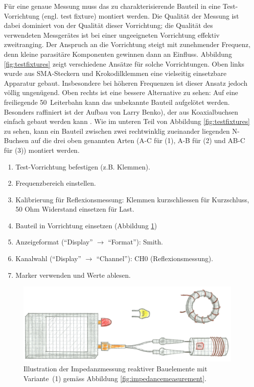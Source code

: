 \documentclass[twoside,a4paper,11pt,halfparskip,DIV=11,notitlepage]{scrartcl}
\begin{document}
Für eine genaue Messung muss das zu charakterisierende Bauteil in eine
Test-Vorrichtung (engl. test fixture) montiert werden. Die Qualität der Messung
ist dabei dominiert von der Qualität dieser Vorrichtung; die Qualität des
verwendeten Messgerätes ist bei einer ungeeigneten Vorrichtung effektiv
zweitranging. Der Anspruch an die Vorrichtung steigt mit zunehmender Frequenz,
denn kleine parasitäre Komponenten gewinnen dann an Einfluss. Abbildung
\ref{fig:testfixtures} zeigt verschiedene Ansätze für solche Vorrichtungen.
Oben links wurde aus SMA-Steckern und Krokodilklemmen eine vielseitig
einsetzbare Apparatur gebaut. Insbesondere bei höheren Frequenzen ist dieser
Ansatz jedoch völlig ungenügend. Oben rechts ist eine bessere Alternative zu
sehen: Auf eine freiliegende 50~\Ohm Leiterbahn kann das unbekannte
Bauteil aufgelötet werden. Besonders raffiniert ist der Aufbau von Larry
Benko), der aus Koaxialbuchsen einfach gebaut werden kann
\cite{benko2020impedance}.  Wie im unteren Teil von Abbildung
\ref{fig:testfixtures} zu sehen, kann ein Bauteil zwischen zwei rechtwinklig
zueinander liegenden N-Buchsen auf die drei oben genannten Arten (A-C für (1),
A-B für (2) und AB-C für (3)) montiert werden.


\begin{enumerate}
    \item Test-Vorrichtung befestigen (z.B. Klemmen).
    \item Frequenzbereich einstellen.
    \item Kalibrierung für Reflexionsmessung: Klemmen kurzschliessen für Kurzschluss, 50 Ohm Widerstand
        einsetzen für Last.
    \item Bauteil in Vorrichtung einsetzen (Abbildung \ref{fig:illustrationimpedance})
    \item Anzeigeformat (``Display'' $\longrightarrow$ ``Format''): Smith.
    \item Kanalwahl (``Display'' $\longrightarrow$ ``Channel''): CH0 (Reflexionsmessung).
    \item Marker verwenden und Werte ablesen.
\end{enumerate}

\begin{figure}[H]
    \includegraphics[width=\textwidth]{figures/illustration_impedance.png}
    \caption{Illustration der Impedanzmessung reaktiver Bauelemente mit Variante~(1) gemäss Abbildung \ref{fig:impedancemeasurement}.}
    \label{fig:illustrationimpedance}
\end{figure}
\end{document}
